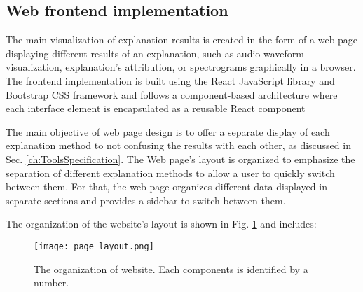 \documentclass[
    bindingoffset=5mm,  %
    footnoteindent=3mm, %
    hyphenation=true    %
]{src/wut-thesis}
\begin{document}
\subsection{Web frontend implementation} \label{ch:ch5WebFrontend}

The main visualization of explanation results is created in the form of a web page displaying different results of
an explanation, such as audio waveform visualization, explanation’s attribution, or spectrograms graphically in a
browser. The frontend implementation is built using the React JavaScript library \cite{ReactDOC}
and Bootstrap CSS framework \cite{BootstrapDOC} and follows a component-based architecture where each interface
element is encapsulated as a reusable React component


The main objective of web page design is to offer a separate display of each explanation method to not
confusing the results with each other, as discussed in Sec. \ref{ch:ToolsSpecification}.
The Web page’s layout is organized to emphasize the separation of different explanation methods to allow
a user to quickly switch between them. For that, the web page organizes different data displayed in
separate sections and provides a sidebar to switch between them.

The organization of the website's layout is shown in Fig. \ref{fig:PageLayout} and includes:

\begin{figure}[h!] %
    \centering
    \texttt{[image: page\_layout.png]}
    \caption{The organization of website. Each components is identified by a number.}
    \label{fig:PageLayout}
\end{figure}
\end{document}
